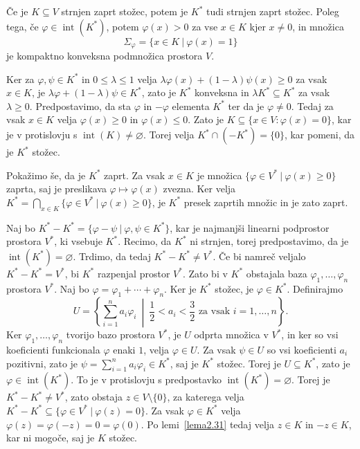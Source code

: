 \documentclass[mat2, tisk]{fmfdelo}
\begin{document}
\begin{lema}\label{lema2.46}
Če je $K \subseteq V$ strnjen zaprt stožec, potem je $K^{*}$ tudi strnjen zaprt stožec. Poleg tega, 
če $\varphi \in \operatorname{int}(K^{*})$, potem $\varphi(x) > 0$ za vse $x \in K$ 
kjer $x \ne 0$, in množica
\[
\Sigma_{\varphi} = \{ x \in K ~|~ \varphi(x) = 1 \}
\]
je kompaktno konveksna podmnožica prostora $V$.
\end{lema}
\begin{dokaz}
Ker za $\varphi,\psi\in K^*$ in $0\leq\lambda\leq1$ velja
$\lambda\varphi(x)+(1-\lambda)\psi(x)\geq0$ za vsak $x\in K$, je
$\lambda\varphi+(1-\lambda)\psi\in K^*$, zato je $K^*$ konveksna in $\lambda K^*\subseteq K^*$ za vsak
$\lambda\geq 0$. Predpostavimo, da sta $\varphi$ in $-\varphi$ elementa
$K^*$ ter da je $\varphi\neq 0$. Tedaj za vsak $x\in K$ velja
$\varphi(x)\geq 0$ in $\varphi(x)\leq 0$. Zato je
$K\subseteq\{x\in V:\varphi(x)=0\}$, kar je v protislovju s
$\operatorname{int}(K)\neq\varnothing$. Torej velja $K^*\cap(-K^*)=\{0\}$, kar pomeni, da je $K^*$ stožec.

Pokažimo še, da je $K^*$ zaprt. Za vsak $x\in K$
je množica $\{\varphi\in V^* ~|~ \varphi(x)\geq0\}$
zaprta, saj je preslikava $\varphi\mapsto\varphi(x)$
zvezna. Ker velja
$K^*=\bigcap\limits_{x\in K}
\{\varphi\in V^* ~|~ \varphi(x)\geq0\}$,
je $K^*$ presek zaprtih množic in je zato zaprt.

Naj bo
$K^*-K^*=\{\varphi-\psi ~|~ \varphi,\psi\in K^*\}$, kar je najmanjši
linearni podprostor prostora $V^*$, ki vsebuje $K^*$. Recimo, da $K^*$ ni strnjen, torej 
predpostavimo, da je $\operatorname{int}(K^*)=\varnothing$. Trdimo, da
tedaj $K^*-K^*\neq V^*$. Če bi namreč veljalo $K^*-K^*=V^*$, bi
$K^*$ razpenjal prostor $V^*$. Zato bi v $K^*$ obstajala baza
$\varphi_1,\ldots,\varphi_n$ prostora $V^*$.
Naj bo
$\varphi=\varphi_1+\cdots+\varphi_n$. Ker je $K^*$ stožec, je
$\varphi\in K^*$. Definirajmo
\[
U=\left\{\sum_{i=1}^n a_i\varphi_i ~\middle|~
\frac{1}{2}<a_i<\frac{3}{2}\text{ za vsak }i=1,\ldots,n\right\}.
\]
Ker $\varphi_1,\ldots,\varphi_n$ tvorijo bazo prostora $V^*$, je
$U$ odprta množica v $V^*$, in ker so vsi koeficienti funkcionala
$\varphi$ enaki $1$, velja $\varphi\in U$. Za vsak $\psi\in U$ so
vsi koeficienti $a_i$ pozitivni, zato je
$\psi=\sum_{i=1}^n a_i\varphi_i\in K^*$, saj je $K^*$ stožec.
Torej je $U\subseteq K^*$, zato je
$\varphi\in\operatorname{int}(K^*)$. To je v protislovju s
predpostavko $\operatorname{int}(K^*)=\varnothing$.
Torej je $K^*-K^*\neq V^*$, zato obstaja $z\in V\setminus\{0\}$, za katerega
velja
$K^*-K^*\subseteq\{\varphi\in V^* ~|~ \varphi(z)=0\}$. Za vsak $\varphi\in K^*$ velja
$\varphi(z)=\varphi(-z)=0=\varphi(0)$. Po lemi~\ref{lema2.31}
tedaj velja $z\in K$ in $-z\in K$, kar ni mogoče, saj je $K$ stožec.


\end{dokaz}
\end{document}
